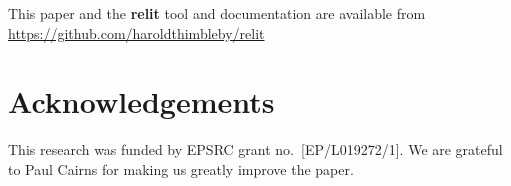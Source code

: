 \documentclass[12pt]{article}
\def\name#1{\textbf{#1}}
\begin{document}
This paper and the \name{relit} tool and documentation are available from \url{https://github.com/haroldthimbleby/relit}



\section*{Acknowledgements}
This research was funded by EPSRC grant no.~[EP/L019272/1]. We are grateful to Paul Cairns for making us greatly improve the paper.

\let\oldbibitem=\bibitem
\def\bibitem{\frenchspacing\raggedright\oldbibitem}


\end{document}
